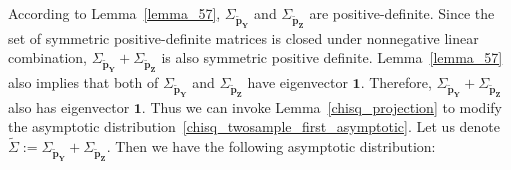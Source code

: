 \documentclass[11pt]{article} %
\begin{document}
According to Lemma~\ref{lemma_57}, $\Sigma_{\tilde{\boldsymbol{p}}_{\boldsymbol{Y}}}$ and  $\Sigma_{\tilde{\boldsymbol{p}}_{\boldsymbol{Z}}}$ are positive-definite.
Since the set of symmetric positive-definite matrices is closed under nonnegative linear combination, 
$\Sigma_{\tilde{\boldsymbol{p}}_{\boldsymbol{Y}}} + \Sigma_{\tilde{\boldsymbol{p}}_{\boldsymbol{Z}}}$ is also symmetric positive definite.
Lemma~\ref{lemma_57} also implies that both of 
$\Sigma_{\tilde{\boldsymbol{p}}_{\boldsymbol{Y}}}$ and  $\Sigma_{\tilde{\boldsymbol{p}}_{\boldsymbol{Z}}}$
have eigenvector $\boldsymbol{1}$.
Therefore, 
$\Sigma_{\tilde{\boldsymbol{p}}_{\boldsymbol{Y}}} + \Sigma_{\tilde{\boldsymbol{p}}_{\boldsymbol{Z}}}$
also has eigenvector $\boldsymbol{1}$.
Thus we can invoke Lemma~\ref{chisq_projection} to modify the  asymptotic distribution~\eqref{chisq_twosample_first_asymptotic}.
Let us denote $\tilde{\Sigma} := \Sigma_{\tilde{\boldsymbol{p}}_{\boldsymbol{Y}}} + \Sigma_{\tilde{\boldsymbol{p}}_{\boldsymbol{Z}}}$.
Then we have the following asymptotic distribution:
\end{document}
